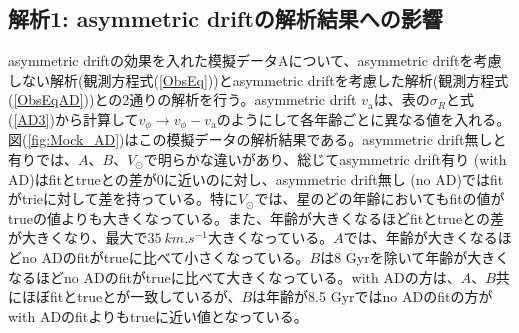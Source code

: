 
\subsection{解析1: asymmetric driftの解析結果への影響}
asymmetric driftの効果を入れた模擬データAについて、asymmetric driftを考慮しない解析(観測方程式(\ref{ObsEq}))とasymmetric driftを考慮した解析(観測方程式(\ref{ObsEqAD}))との2通りの解析を行う。asymmetric drift $v_{\mathrm{a}}$は、表の$\sigma_R$と式(\ref{AD3})から計算して$v_{\phi}\to v_{\phi}-v_{\mathrm{a}}$のようにして各年齢ごとに異なる値を入れる。図(\ref{fig:Mock_AD})はこの模擬データの解析結果である。asymmetric drift無しと有りでは、$A、B、V_{\odot}$で明らかな違いがあり、総じてasymmetric drift有り (with AD)はfitとtrueとの差が0に近いのに対し、asymmetric drift無し (no AD)ではfitがtrieに対して差を持っている。特に$V_{\odot}$では、星のどの年齢においてもfitの値がtrueの値よりも大きくなっている。また、年齢が大きくなるほどfitとtrueとの差が大きくなり、最大で$\SI{35}{km.s^{-1}}$大きくなっている。$A$では、年齢が大きくなるほどno ADのfitがtrueに比べて小さくなっている。$B$は8 Gyrを除いて年齢が大きくなるほどno ADのfitがtrueに比べて大きくなっている。with ADの方は、$A$、$B$共にほぼfitとtrueとが一致しているが、$B$は年齢が8.5 Gyrではno ADのfitの方がwith ADのfitよりもtrueに近い値となっている。

